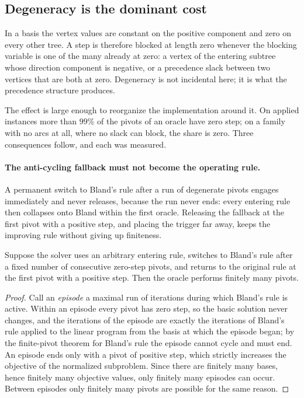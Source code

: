 \subsection{Degeneracy is the dominant cost}\label{sec:degeneracy-cost}

In a basis the vertex values are constant on the positive component and zero on
every other tree. A step is therefore blocked at length zero whenever the
blocking variable is one of the many already at zero: a vertex of the entering
subtree whose direction component is negative, or a precedence slack between two
vertices that are both at zero. Degeneracy is not incidental here; it is what the
precedence structure produces.

The effect is large enough to reorganize the implementation around it. On
applied instances more than $99\%$ of the pivots of an oracle have zero step; on
a family with no arcs at all, where no slack can block, the share is zero. Three
consequences follow, and each was measured.

\paragraph{The anti-cycling fallback must not become the operating rule.}
A permanent switch to Bland's rule after a run of degenerate pivots engages
immediately and never releases, because the run never ends: every entering rule
then collapses onto Bland within the first oracle. Releasing the fallback at the
first pivot with a positive step, and placing the trigger far away, keeps the
improving rule without giving up finiteness.

\begin{proposition}\label{prop:episodes}
Suppose the solver uses an arbitrary entering rule, switches to Bland's rule
after a fixed number of consecutive zero-step pivots, and returns to the
original rule at the first pivot with a positive step. Then the oracle performs
finitely many pivots.
\end{proposition}
\begin{proof}
Call an \emph{episode} a maximal run of iterations during which Bland's rule is
active. Within an episode every pivot has zero step, so the basic solution never
changes, and the iterations of the episode are exactly the iterations of Bland's
rule applied to the linear program from the basis at which the episode began;
by the finite-pivot theorem for Bland's rule the episode cannot cycle and must
end. An episode ends only with a pivot of positive step, which strictly
increases the objective of the normalized subproblem. Since there are finitely
many bases, hence finitely many objective values, only finitely many episodes
can occur. Between episodes only finitely many pivots are possible for the same
reason.
\end{proof}


